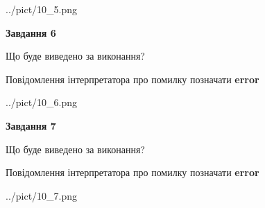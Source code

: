 \documentclass[10pt, ukrainian]{article}
\begin{document}
{\begin {large}
\begin{center}
	{../pict/10_5.png}
\end{center}
\newpage

{\begin {center}\textbf{Завдання 6}\end {center}}\par
Що буде виведено за виконання? \par
Повідомлення інтерпретатора про помилку позначати \textbf{error}

\begin{center}
	{../pict/10_6.png}
\end{center}
\newpage

{\begin {center}\textbf{Завдання 7}\end {center}}\par
Що буде виведено за виконання? \par
Повідомлення інтерпретатора про помилку позначати \textbf{error}

\begin{center}
	{../pict/10_7.png}
\end{center}
\newpage

\end {large}}
\end{document}
